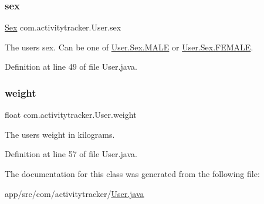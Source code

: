 \subsubsection{\texorpdfstring{sex}{sex}}
{\footnotesize\ttfamily \mbox{\hyperlink{enumcom_1_1activitytracker_1_1_user_1_1_sex}{Sex}} com.\+activitytracker.\+User.\+sex\hspace{0.3cm}{\ttfamily [private]}}

The user\textquotesingle{}s sex. Can be one of \mbox{\hyperlink{enumcom_1_1activitytracker_1_1_user_1_1_sex_ad3b626a38bd4615eb621d75b939f412d}{User.\+Sex.\+M\+A\+LE}} or \mbox{\hyperlink{enumcom_1_1activitytracker_1_1_user_1_1_sex_a5c22ece8a4df71ed5202cd492990a752}{User.\+Sex.\+F\+E\+M\+A\+LE}}. 

Definition at line 49 of file User.\+java.

\mbox{\label{classcom_1_1activitytracker_1_1_user_a8a30c6c08983e513b462bcc035434c9e}} 
\subsubsection{\texorpdfstring{weight}{weight}}
{\footnotesize\ttfamily float com.\+activitytracker.\+User.\+weight\hspace{0.3cm}{\ttfamily [private]}}

The user\textquotesingle{}s weight in kilograms. 

Definition at line 57 of file User.\+java.



The documentation for this class was generated from the following file\+:\begin{DoxyCompactItemize}
\item 
app/src/com/activitytracker/\mbox{\hyperlink{_user_8java}{User.\+java}}\end{DoxyCompactItemize}
